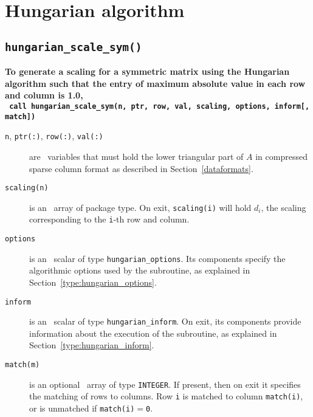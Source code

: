 
\section{Hungarian algorithm}

\subsection{\texttt{hungarian\_scale\_sym()}}

\textbf{\noindent
   To generate a scaling for a symmetric matrix using the Hungarian algorithm such that the entry of maximum absolute value in each row and column is 1.0,
   \vspace*{0.3cm} \\
   \texttt{ \hspace*{0.2cm}
      call hungarian\_scale\_sym(n, ptr, row, val, scaling, options, inform[, match])
   }
   \vspace{0.3cm}
}

\begin{description}

\item[\texttt{n}, \texttt{ptr(:)}, \texttt{row(:)}, \texttt{val(:)}] are \intentin\ variables that must hold the lower triangular part of $A$ in compressed sparse column format as described in Section~\ref{dataformats}.

\item[\texttt{scaling(n)}] is an \intentout\ array of package type. On exit,
\texttt{scaling(i)} will hold $d_i$, the scaling corresponding to the
\texttt{i}-th row and column.

\item[\texttt{options}] is an \intentin\ scalar of type \texttt{hungarian\_options}. Its components specify the algorithmic options used by the subroutine, as explained in Section~\ref{type:hungarian_options}.

\item[\texttt{inform}] is an \intentout\ scalar of type \texttt{hungarian\_inform}. On exit, its components provide information about the execution of the subroutine, as explained in Section~\ref{type:hungarian_inform}.

\item[\texttt{match(m)}] is an optional \intentout\ array of type {\tt INTEGER}.
If present, then on exit it specifies the matching of rows to
columns. Row \texttt{i} is matched to column \texttt{match(i)}, or is unmatched
if \texttt{match(i)}$=$\texttt{0}.

\end{description}

